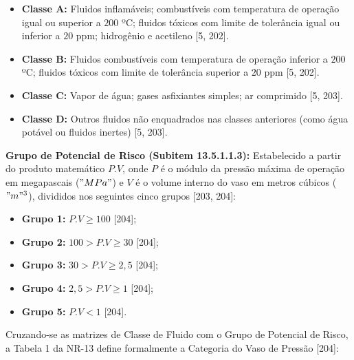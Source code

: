 \begin{itemize}
  \item \textbf{Classe A:} Fluidos inflamáveis; combustíveis com temperatura de operação igual ou superior a $200$ ºC; fluidos tóxicos com limite de tolerância igual ou inferior a $20$ ppm; hidrogênio e acetileno [5, 202].
  \item \textbf{Classe B:} Fluidos combustíveis com temperatura de operação inferior a $200$ ºC; fluidos tóxicos com limite de tolerância superior a $20$ ppm [5, 202].
  \item \textbf{Classe C:} Vapor de água; gases asfixiantes simples; ar comprimido [5, 203].
  \item \textbf{Classe D:} Outros fluidos não enquadrados nas classes anteriores (como água potável ou fluidos inertes) [5, 203].
\end{itemize}

\textbf{Grupo de Potencial de Risco (Subitem 13.5.1.1.3):} Estabelecido a partir do produto matemático $P.V$, onde $P$ é o módulo da pressão máxima de operação em megapascais ($"MPa"$) e $V$ é o volume interno do vaso em metros cúbicos ($"m"^3$), divididos nos seguintes cinco grupos [203, 204]:
\begin{itemize}
  \item \textbf{Grupo 1:} $P.V \ge  100$ [204];
  \item \textbf{Grupo 2:} $100 > P.V \ge  30$ [204];
  \item \textbf{Grupo 3:} $30 > P.V \ge  2,5$ [204];
  \item \textbf{Grupo 4:} $2,5 > P.V \ge  1$ [204];
  \item \textbf{Grupo 5:} $P.V < 1$ [204].
\end{itemize}

Cruzando-se as matrizes de Classe de Fluido com o Grupo de Potencial de Risco, a Tabela 1 da NR-13 define formalmente a Categoria do Vaso de Pressão [204]:

% 


